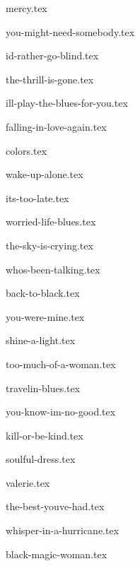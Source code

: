 \begin{songs}{}

  {mercy.tex}
  \sclearpage

  {you-might-need-somebody.tex}
  \sclearpage

  {id-rather-go-blind.tex}
  \sclearpage

  {the-thrill-is-gone.tex}
  \sclearpage

  {ill-play-the-blues-for-you.tex}
  \sclearpage

  {falling-in-love-again.tex}
  \sclearpage

  {colors.tex}
  \sclearpage

  {wake-up-alone.tex}
  \sclearpage

  {its-too-late.tex}
  \sclearpage

  {worried-life-blues.tex}
  \sclearpage

  {the-sky-is-crying.tex}
  \sclearpage

  {whos-been-talking.tex}
  \sclearpage

  {back-to-black.tex}
  \sclearpage

  {you-were-mine.tex}
  \sclearpage

  {shine-a-light.tex}
  \sclearpage

  {too-much-of-a-woman.tex}
  \sclearpage

  {travelin-blues.tex}
  \sclearpage

  {you-know-im-no-good.tex}
  \sclearpage

  {kill-or-be-kind.tex}
  \sclearpage

  {soulful-dress.tex}
  \sclearpage

  {valerie.tex}
  \sclearpage

  {the-best-youve-had.tex}
  \sclearpage

  {whisper-in-a-hurricane.tex}
  \sclearpage

  {black-magic-woman.tex}
  \sclearpage


\end{songs}
